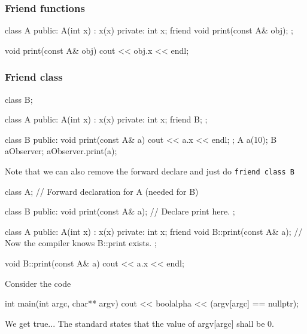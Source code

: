 \documentclass{report}
\begin{document}
\bigbreak \noindent 
\subsubsection{Friend functions}
\bigbreak \noindent 
\begin{cppcode}
    class A {
        public:
        A(int x) : x(x) {}
        private:
        int x{};
        friend void print(const A& obj); 
    };

    void print(const A& obj) {
        cout << obj.x << endl;
    }
\end{cppcode}

\bigbreak \noindent 
\subsubsection{Friend class}
\bigbreak \noindent 
\begin{cppcode}
    class B;

    class A {
        public:
        A(int x) : x(x) {}
        private:
        int x{};
        friend B;
    };

    class B {
        public: 
        void print(const A& a) {
            cout << a.x << endl;
        }
    };
    A a(10);
    B aObserver{};
    aObserver.print(a);
\end{cppcode}
\bigbreak \noindent 
Note that we can also remove the forward declare and just do \texttt{friend class B}
\bigbreak \noindent 
\begin{cppcode}
    class A; // Forward declaration for A (needed for B)

    class B {
        public:
        void print(const A& a); // Declare print here.
    };

    class A {
        public:
        A(int x) : x(x) {}
        private:
        int x{};
        friend void B::print(const A& a);  // Now the compiler knows B::print exists.
    };

    void B::print(const A& a) {
        cout << a.x << endl;
    }
\end{cppcode}

\pagebreak 
{}
\bigbreak \noindent 
Consider the code
\bigbreak \noindent 
\begin{cppcode}
    int main(int argc, char** argv) {
        cout << boolalpha << (argv[argc] == nullptr);
    }
\end{cppcode}
\bigbreak \noindent 
We get true... The standard states that the value of argv[argc] shall be 0.
\end{document}
